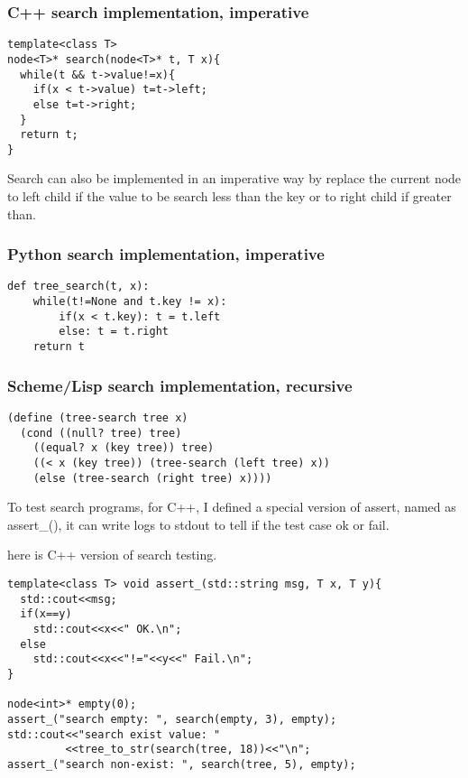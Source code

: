 \documentclass{article}
\begin{document}
\subsubsection*{C++ search implementation, imperative}
\lstset{language=C++}
\begin{lstlisting}
template<class T>
node<T>* search(node<T>* t, T x){
  while(t && t->value!=x){
    if(x < t->value) t=t->left;
    else t=t->right;
  }
  return t;
}
\end{lstlisting}

Search can also be implemented in an imperative way by replace the current
node to left child if the value to be search less than the key or to right 
child if greater than.

\subsubsection*{Python search implementation, imperative}
\lstset{language=Python}
\begin{lstlisting}
def tree_search(t, x):
    while(t!=None and t.key != x):
        if(x < t.key): t = t.left
        else: t = t.right
    return t
\end{lstlisting}

\subsubsection*{Scheme/Lisp search implementation, recursive}
\lstset{language=lisp}
\begin{lstlisting}
(define (tree-search tree x)
  (cond ((null? tree) tree)
	((equal? x (key tree)) tree)
	((< x (key tree)) (tree-search (left tree) x))
	(else (tree-search (right tree) x))))
\end{lstlisting}

To test search programs, for C++, I defined a special version of assert, named
as assert\_(), it can write logs to stdout to tell if the test case ok or fail.

here is C++ version of search testing.

\lstset{language=c++}
\begin{lstlisting}
template<class T> void assert_(std::string msg, T x, T y){
  std::cout<<msg;
  if(x==y)
    std::cout<<x<<" OK.\n";
  else
    std::cout<<x<<"!="<<y<<" Fail.\n";
}

node<int>* empty(0);
assert_("search empty: ", search(empty, 3), empty);
std::cout<<"search exist value: "
         <<tree_to_str(search(tree, 18))<<"\n";
assert_("search non-exist: ", search(tree, 5), empty);
\end{lstlisting}
\end{document}
